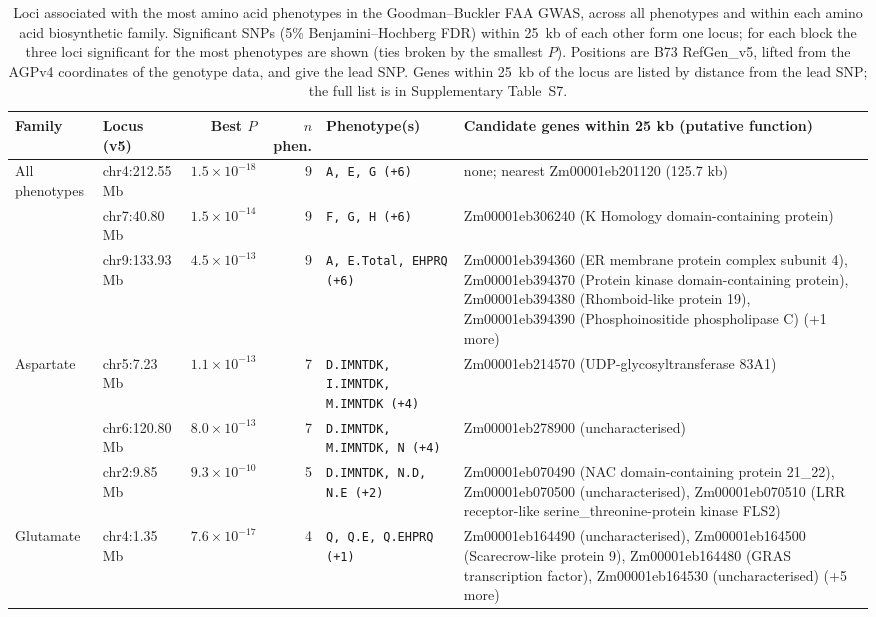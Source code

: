 \begin{table}[t]
\centering
\caption{Loci associated with the most amino acid phenotypes in the Goodman--Buckler FAA GWAS, across all phenotypes and within each amino acid biosynthetic family. Significant SNPs (5\% Benjamini--Hochberg FDR) within 25~kb of each other form one locus; for each block the three loci significant for the most phenotypes are shown (ties broken by the smallest $P$). Positions are B73 RefGen\_v5, lifted from the AGPv4 coordinates of the genotype data, and give the lead SNP. Genes within 25~kb of the locus are listed by distance from the lead SNP; the full list is in Supplementary Table~S7.}
\label{tab:amino_gwas_top_loci}
\footnotesize
\setlength{\tabcolsep}{4pt}
\begin{tabularx}{\textwidth}{@{}l l r r l >{\raggedright\arraybackslash}X@{}}
\hline
Family & Locus (v5) & Best $P$ & $n$ phen. & Phenotype(s) & Candidate genes within 25 kb (putative function) \\
\hline
All phenotypes & chr4:212.55 Mb & $1.5\times10^{-18}$ & 9 & \texttt{A, E, G (+6)} & none; nearest Zm00001eb201120 (125.7 kb) \\
 & chr7:40.80 Mb & $1.5\times10^{-14}$ & 9 & \texttt{F, G, H (+6)} & Zm00001eb306240 (K Homology domain-containing protein) \\
 & chr9:133.93 Mb & $4.5\times10^{-13}$ & 9 & \texttt{A, E.Total, EHPRQ (+6)} & Zm00001eb394360 (ER membrane protein complex subunit 4), Zm00001eb394370 (Protein kinase domain-containing protein), Zm00001eb394380 (Rhomboid-like protein 19), Zm00001eb394390 (Phosphoinositide phospholipase C) (+1 more) \\
\hline
Aspartate & chr5:7.23 Mb & $1.1\times10^{-13}$ & 7 & \texttt{D.IMNTDK, I.IMNTDK, M.IMNTDK (+4)} & Zm00001eb214570 (UDP-glycosyltransferase 83A1) \\
 & chr6:120.80 Mb & $8.0\times10^{-13}$ & 7 & \texttt{D.IMNTDK, M.IMNTDK, N (+4)} & Zm00001eb278900 (uncharacterised) \\
 & chr2:9.85 Mb & $9.3\times10^{-10}$ & 5 & \texttt{D.IMNTDK, N.D, N.E (+2)} & Zm00001eb070490 (NAC domain-containing protein 21\_22), Zm00001eb070500 (uncharacterised), Zm00001eb070510 (LRR receptor-like serine\_threonine-protein kinase FLS2) \\
\hline
Glutamate & chr4:1.35 Mb & $7.6\times10^{-17}$ & 4 & \texttt{Q, Q.E, Q.EHPRQ (+1)} & Zm00001eb164490 (uncharacterised), Zm00001eb164500 (Scarecrow-like protein 9), Zm00001eb164480 (GRAS transcription factor), Zm00001eb164530 (uncharacterised) (+5 more) \\

\end{tabularx}
\end{table}
